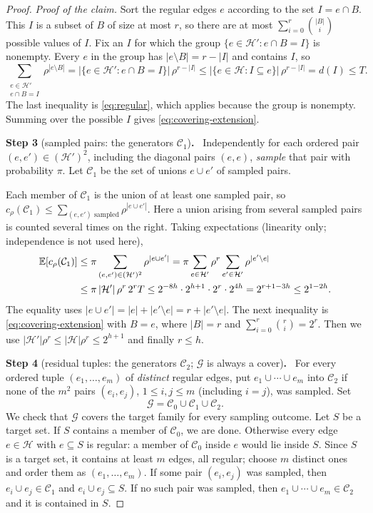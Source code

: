 \documentclass[11pt,letterpaper]{article}
\theoremstyle{definition}
\theoremstyle{remark}
\numberwithin{equation}{section}
\newcommand{\step}[2]{\medskip\noindent\textbf{Step #1} (#2)\textbf{.}\ }
\begin{document}
\begin{proof}
\emph{Proof of the claim.} Sort the regular edges $e$ according to the set
$I=e\cap B$. This $I$ is a subset of $B$ of size at most $r$, so there are
at most $\sum_{i=0}^r\binom{|B|}{i}$ possible values of $I$. Fix an $I$ for
which the group $\{e\in\mathcal H':e\cap B=I\}$ is nonempty. Every $e$ in
the group has $|e\setminus B|=r-|I|$ and contains $I$, so
\[
\sum_{\substack{e\in\mathcal H'\\e\cap B=I}}
  \rho^{|e\setminus B|}
=|\{e\in\mathcal H':e\cap B=I\}|\,\rho^{r-|I|}
\le|\{e\in\mathcal H:I\subseteq e\}|\,\rho^{r-|I|}
= d(I)\le T.
\]
The last inequality is \eqref{eq:regular}, which applies because the group
is nonempty. Summing over the possible $I$ gives
\eqref{eq:covering-extension}.

\step{3}{sampled pairs: the generators $\mathcal C_1$}
Independently for each ordered pair \((e,e')\in(\mathcal H')^2\),
including the diagonal pairs $(e,e)$, \emph{sample} that pair with
probability \(\pi\). Let \(\mathcal C_1\) be the set of unions $e\cup e'$
of sampled pairs.

Each member of $\mathcal C_1$ is the union of at least one sampled pair, so
$c_\rho(\mathcal C_1)\le\sum_{(e,e')\text{ sampled}}\rho^{|e\cup e'|}$.
Here a union arising from several sampled pairs is counted several
times on the right. Taking expectations (linearity only; independence is not
used here),
\begin{align}
\mathbb E[c_\rho(\mathcal C_1)]
&\le\pi\sum_{(e,e')\in(\mathcal H')^2}\rho^{|e\cup e'|}
=\pi\sum_{e\in\mathcal H'}\rho^{r}\sum_{e'\in\mathcal H'}\rho^{|e'\setminus e|}
\notag\\
&\le\pi\,|\mathcal H'|\,\rho^r\,2^rT
\le2^{-8h}\cdot2^{h+1}\cdot2^r\cdot2^{4h}
=2^{r+1-3h}\le2^{1-2h}.
\label{eq:covering-pair-cost}
\end{align}
The equality uses $|e\cup e'|=|e|+|e'\setminus e|=r+|e'\setminus e|$. The
next inequality is \eqref{eq:covering-extension} with $B=e$, where $|B|=r$
and $\sum_{i=0}^r\binom ri=2^r$. Then we use
$|\mathcal H'|\rho^r\le|\mathcal H|\rho^r\le2^{h+1}$ and finally $r\le h$.

\step{4}{residual tuples: the generators $\mathcal C_2$; $\mathcal G$ is always a cover}
For every ordered tuple \((e_1,\ldots,e_m)\) of \emph{distinct} regular
edges, put \(e_1\cup\cdots\cup e_m\) into \(\mathcal C_2\) if none of the
$m^2$ pairs \((e_i,e_j)\), \(1\le i,j\le m\) (including $i=j$), was sampled.
Set
\[
\mathcal G=\mathcal C_0\cup\mathcal C_1\cup\mathcal C_2 .
\]
We check that $\mathcal G$ covers the target family for every sampling
outcome. Let $S$ be a target set. If $S$ contains a member of
$\mathcal C_0$, we are done. Otherwise every edge $e\in\mathcal H$ with
$e\subseteq S$ is regular: a member of $\mathcal C_0$ inside $e$ would lie
inside $S$. Since $S$ is a target set, it contains at least $m$ edges, all
regular; choose $m$ distinct ones and order them as $(e_1,\ldots,e_m)$. If
some pair $(e_i,e_j)$ was sampled, then $e_i\cup e_j\in\mathcal C_1$ and
$e_i\cup e_j\subseteq S$. If no such pair was sampled, then
$e_1\cup\cdots\cup e_m\in\mathcal C_2$ and it is contained in $S$.


\end{proof}
\end{document}
